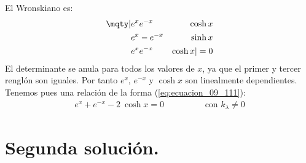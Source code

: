 \par
El Wronskiano es:
\begin{align*}
\mqty|
e^{x}  & e^{-x} & \cosh x \\
e^{x}  & -e^{-x} & \sinh x \\
e^{x}  & e^{-x} & \cosh x
| = 0
\end{align*}
El determinante se anula para todos los valores de $x$, ya que el primer y tercer renglón son iguales. Por tanto $e^{x}$, $e^{-x}$ y $\cosh x$ son linealmente dependientes. Tenemos pues una relación de la forma (\ref{eq:ecuacion_09_111}):
\begin{align*}
e^{x} + e^{-x} - 2 \: \cosh x = 0 \hspace{2cm} \text{con } k_{\lambda} \neq 0
\end{align*}

\section{Segunda solución.}

